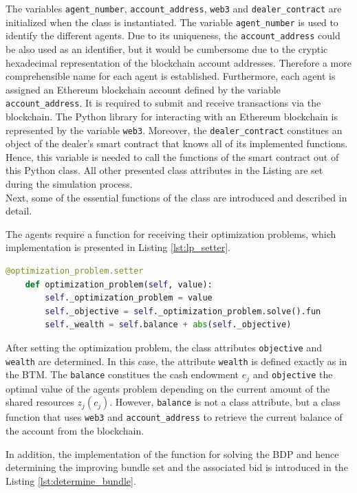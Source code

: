 The variables \verb|agent_number|, \verb|account_address|, \verb|web3| and \verb|dealer_contract| are initialized when the class is instantiated.
The variable \verb|agent_number| is used to identify the different agents.
Due to its uniqueness, the \verb|account_address| could be also used as an identifier, 
but it would be cumbersome due to the cryptic hexadecimal representation of the blockchain account addresses.
Therefore a more comprehensible name for each agent is established.
Furthermore, each agent is assigned an Ethereum blockchain account defined by the variable \verb|account_address|. It is required to submit and 
receive transactions via the blockchain.
The Python library for interacting with an Ethereum blockchain is represented by the variable \verb|web3|.
Moreover, the \verb|dealer_contract| constitues an object of the dealer's smart contract that knows all of its implemented functions.
Hence, this variable is needed to call the functions of the smart contract out of this Python class.
All other presented class attributes in the Listing are set during the simulation process.\\

Next, some of the essential functions of the class are introduced and described in detail.

The agents require a function for receiving their optimization problems, which 
implementation is presented in Listing \ref{lst:lp_setter}.

\begin{lstlisting}[label=lst:lp_setter, caption=Setter of optimization problem, language=Python]
    @optimization_problem.setter
    def optimization_problem(self, value):
        self._optimization_problem = value
        self._objective = self._optimization_problem.solve().fun
        self._wealth = self.balance + abs(self._objective)
\end{lstlisting}

After setting the optimization problem, the class attributes \verb|objective| and \verb|wealth| are determined.
In this case, the attribute \verb|wealth| is defined exactly as in the BTM. 
The \verb|balance| constitues the cash endowment $e_{j}$ and \verb|objective| the optimal value of the agents
problem depending on the current amount of the shared resources $z_{j}(c_{j})$.
However, \verb|balance| is not a class attribute, but a class function that uses 
\verb|web3| and \verb|account_address| to retrieve the current
balance of the account from the blockchain.

In addition, the implementation of the function for solving the BDP and hence determining 
the improving bundle set and the associated bid is introduced in the Listing \ref{lst:determine_bundle}.

